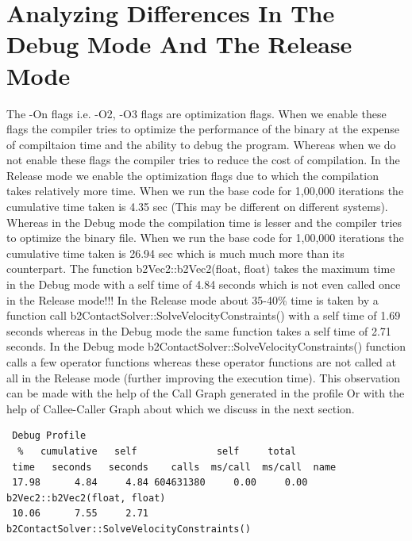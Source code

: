 \documentclass[11pt]{article}
\begin{document}
\section{Analyzing Differences In The Debug Mode And The Release Mode}
	The -On flags i.e. -O2, -O3 flags are optimization flags. When we enable these flags the compiler tries to optimize the performance of the binary at the expense of compiltaion time and the ability to debug the program. Whereas when we do not enable these flags the compiler tries to reduce the cost of compilation.\newline
	In the Release mode we enable the optimization flags due to which the compilation takes relatively more time. When we run the base code for 1,00,000 iterations the cumulative time taken is 4.35 sec (This may be different on different systems). Whereas in the Debug mode the compilation time is lesser and the compiler tries to optimize the binary file. When we run the base code for 1,00,000 iterations the cumulative time taken is 26.94 sec which is much much more than its counterpart.\newline
	The function b2Vec2::b2Vec2(float, float) takes the maximum time in the Debug mode with a self time of 4.84 seconds which is not even called once in the Release mode!!! \newline
	In the Release mode about 35-40\% time is taken by a function call b2ContactSolver::SolveVelocityConstraints() with a self time of 1.69 seconds whereas in the Debug mode the same function takes a self time of 2.71 seconds. In the Debug mode b2ContactSolver::SolveVelocityConstraints() function calls a few operator functions whereas these operator functions are not called at all in the Release mode (further improving the execution time). This observation can be made with the help of the Call Graph generated in the profile Or with the help of Callee-Caller Graph about which we discuss in the next section. 
\begin{verbatim}
 Debug Profile
  %   cumulative   self              self     total           
 time   seconds   seconds    calls  ms/call  ms/call  name    
 17.98      4.84     4.84 604631380     0.00     0.00  b2Vec2::b2Vec2(float, float)
 10.06      7.55     2.71                             b2ContactSolver::SolveVelocityConstraints()
\end{verbatim} 

\end{document}

